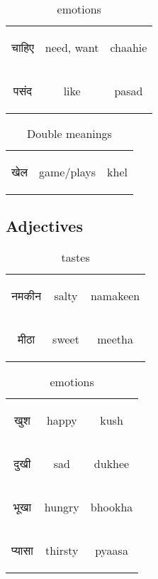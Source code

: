 \begin{table}[H]
    \centering
    \begin{tabular}{c|c|c}
        \begin{hindi}चाहिए \end{hindi} & need, want & chaahie\\
        \begin{hindi}पसंद  \end{hindi} & like & pasad\\
    \end{tabular}
    \caption{emotions}
    \label{tab:verb_emotions}
\end{table}

\begin{table}[H]
    \centering
    \begin{tabular}{c|c|c}
        \begin{hindi} खेल \end{hindi} & game/plays & khel \\
    \end{tabular}
    \caption{Double meanings}
    \label{tab:doublemeanings}
\end{table}

\newpage  
\subsection{Adjectives}

\begin{table}[H]
    \centering
    \begin{tabular}{c|c|c}        
    \begin{hindi}नमकीन\end{hindi} & salty & namakeen \\
    \begin{hindi}मीठा\end{hindi} & sweet & meetha \\

    \end{tabular}
    \caption{tastes}
    \label{tab:adjective_tastes}
\end{table}


\begin{table}[H]
    \centering
    \begin{tabular}{c|c|c}        
    \begin{hindi} खुश \end{hindi} & happy & kush \\
    \begin{hindi} दुखी \end{hindi} & sad & dukhee \\
    \begin{hindi} भूखा \end{hindi} & hungry & bhookha \\
    \begin{hindi} प्यासा \end{hindi} & thirsty & pyaasa \\
    \end{tabular}
    \caption{emotions}
    \label{tab:adjective_emotions}
\end{table}

